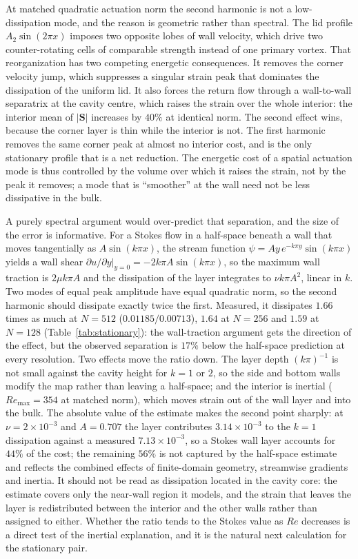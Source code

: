 \documentclass[11pt,a4paper]{article}
\newcommand{\Sij}{\mathbf{S}}
\newenvironment{chgadd}{\par\color{blue}}{\par\color{black}}
\begin{document}
At matched quadratic actuation norm the second harmonic is not a low-dissipation
mode, and the reason is geometric rather than spectral. The lid profile
$A_2\sin(2\pi x)$ imposes two opposite lobes of wall velocity, which drive two
counter-rotating cells of comparable strength instead of one primary vortex. That
reorganization has two competing energetic consequences. It removes the corner
velocity jump, which suppresses a singular strain peak that dominates the
dissipation of the uniform lid. It also forces the return flow through a
wall-to-wall separatrix at the cavity centre, which raises the strain over the
whole interior: the interior mean of $|\Sij|$ increases by $40\%$ at identical
norm. The second effect wins, because the corner layer is thin while the interior
is not. The first harmonic removes the same corner peak at almost no interior
cost, and is the only stationary profile that is a net reduction. The energetic
cost of a spatial actuation mode is thus controlled by the volume over which it
raises the strain, not by the peak it removes; a mode that is ``smoother'' at the
wall need not be less dissipative in the bulk.

\begin{chgadd}
A purely spectral argument would over-predict that separation, and the size of the
error is informative. For a Stokes flow in a half-space beneath a wall that moves
tangentially as $A\sin(k\pi x)$, the stream function $\psi=Ay\,e^{-k\pi y}\sin(k\pi x)$
yields a wall shear $\left.\partial u/\partial y\right|_{y=0}=-2k\pi A\sin(k\pi x)$,
so the maximum wall traction is $2\mu k\pi A$ and the dissipation of the layer
integrates to $\nu k\pi A^2$, linear in $k$. Two modes of equal peak amplitude have
equal quadratic norm, so the second harmonic should dissipate exactly twice the first.
Measured, it dissipates $1.66$ times as much at $N=512$ ($0.01185/0.00713$), $1.64$
at $N=256$ and $1.59$ at $N=128$ (Table~\ref{tab:stationary}): the wall-traction
argument gets the direction of the effect, but the observed separation is $17\%$
below the half-space prediction at every resolution. Two effects move the ratio down.
The layer depth $(k\pi)^{-1}$ is not small against the cavity height for $k=1$ or
$2$, so the side and bottom walls modify the map rather than leaving a half-space;
and the interior is inertial ($Re_{\max}=354$ at matched norm), which moves strain
out of the wall layer and into the bulk. The absolute value of the estimate makes
the second point sharply: at $\nu=2\times10^{-3}$ and $A=0.707$ the layer contributes
$3.14\times10^{-3}$ to the $k=1$ dissipation against a measured $7.13\times10^{-3}$,
so a Stokes wall layer accounts for $44\%$ of the cost; the remaining $56\%$ is not
captured by the half-space estimate and reflects the combined effects of
finite-domain geometry, streamwise gradients and inertia. It should not be read as
dissipation located in the cavity core: the estimate covers only the near-wall
region it models, and the strain that leaves the layer is redistributed between the
interior and the other walls rather than assigned to either. Whether the ratio tends
to the Stokes value as $Re$ decreases is a direct test of the inertial explanation,
and it is the natural next calculation for the stationary pair.
\end{chgadd}
\end{document}
